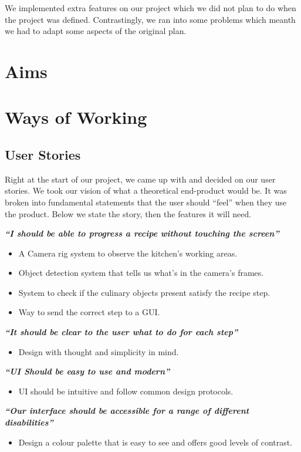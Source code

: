 \documentclass{article}
\begin{document}
We implemented extra features on our project which we did not plan to do when the project was defined. Contrastingly, we ran into some problems which meanth we had to adapt some aspects of the original plan.

    

    \section{Aims}

    \section{Ways of Working}
    \subsection{User Stories}
    Right at the start of our project, we came up with and decided on our user stories. We took our vision of what a theoretical end-product would be. It was broken into fundamental statements that the user should “feel” when they use the product. Below we state the story, then the features it will need.

    \begin{center}
        \textbf{\textit{“I should be able to progress a recipe without touching the screen”}}
        \begin{itemize}
            \item A Camera rig system to observe the kitchen's working areas.
            \item Object detection system that tells us what’s in the camera's frames. 
            \item System to check if the culinary objects present satisfy the recipe step.
            \item Way to send the correct step to a GUI.
        \end{itemize}
        
        \textbf{\textit{“It should be clear to the user what to do for each step”}}
        \begin{itemize}
            \item Design with thought and simplicity in mind.
        \end{itemize}
        \textbf{\textit{“UI Should be easy to use and modern”}}
        \begin{itemize}
            \item UI should be intuitive and follow common design protocols.
        \end{itemize}
        
        \textbf{\textit{“Our interface should be accessible for a range of different disabilities”}}
        \begin{itemize}
            \item Design a colour palette that is easy to see and offers good levels of contrast.
        \end{itemize}
        
    \end{center}
\end{document}
